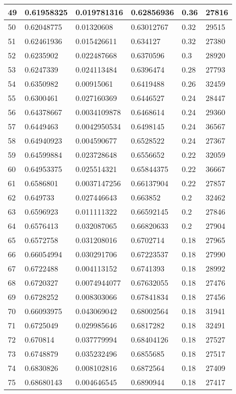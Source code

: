 \begin{longtable}{|l|l|l|l|l|l|}
49 & 0.61958325 & 0.019781316 & 0.62856936 & 0.36 & 27816 \\ \hline 
50 & 0.62048775 & 0.01320608 & 0.63012767 & 0.32 & 29515 \\ \hline 
51 & 0.62461936 & 0.015426611 & 0.634127 & 0.32 & 27380 \\ \hline 
52 & 0.6235902 & 0.022487668 & 0.6370596 & 0.3 & 28920 \\ \hline 
53 & 0.6247339 & 0.024113484 & 0.6396474 & 0.28 & 27793 \\ \hline 
54 & 0.6350982 & 0.00915061 & 0.6419488 & 0.26 & 32459 \\ \hline 
55 & 0.6300461 & 0.027160369 & 0.6446527 & 0.24 & 28447 \\ \hline 
56 & 0.64378667 & 0.0034109878 & 0.6468614 & 0.24 & 29360 \\ \hline 
57 & 0.6449463 & 0.0042950534 & 0.6498145 & 0.24 & 36567 \\ \hline 
58 & 0.64940923 & 0.004590677 & 0.6528522 & 0.24 & 27367 \\ \hline 
59 & 0.64599884 & 0.023728648 & 0.6556652 & 0.22 & 32059 \\ \hline 
60 & 0.64953375 & 0.025514321 & 0.65844375 & 0.22 & 36667 \\ \hline 
61 & 0.6586801 & 0.0037147256 & 0.66137904 & 0.22 & 27857 \\ \hline 
62 & 0.649733 & 0.027446643 & 0.663852 & 0.2 & 32462 \\ \hline 
63 & 0.6596923 & 0.011111322 & 0.66592145 & 0.2 & 27846 \\ \hline 
64 & 0.6576413 & 0.032087065 & 0.66820633 & 0.2 & 27904 \\ \hline 
65 & 0.6572758 & 0.031208016 & 0.6702714 & 0.18 & 27965 \\ \hline 
66 & 0.66054994 & 0.030291706 & 0.67223537 & 0.18 & 27990 \\ \hline 
67 & 0.6722488 & 0.004113152 & 0.6741393 & 0.18 & 28992 \\ \hline 
68 & 0.6720327 & 0.0074944077 & 0.67632055 & 0.18 & 27476 \\ \hline 
69 & 0.6728252 & 0.008303066 & 0.67841834 & 0.18 & 27456 \\ \hline 
70 & 0.66093975 & 0.043069042 & 0.68002564 & 0.18 & 31941 \\ \hline 
71 & 0.6725049 & 0.029985646 & 0.6817282 & 0.18 & 32491 \\ \hline 
72 & 0.670814 & 0.037779994 & 0.68404126 & 0.18 & 27527 \\ \hline 
73 & 0.6748879 & 0.035232496 & 0.6855685 & 0.18 & 27517 \\ \hline 
74 & 0.6830826 & 0.008102816 & 0.6872564 & 0.18 & 27409 \\ \hline 
75 & 0.68680143 & 0.004646545 & 0.6890944 & 0.18 & 27417 \\ \hline 
\end{longtable}
